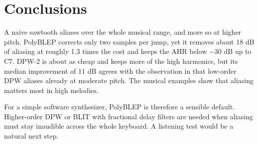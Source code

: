 \section{Conclusions}\label{sec:conclusions}

A naive sawtooth aliases over the whole musical range, and more so at
higher pitch. PolyBLEP corrects only two samples per jump, yet it removes
about 18 dB of aliasing at roughly 1.3 times the cost and keeps the AHR
below $-30$ dB up to C7. DPW-2 is about as cheap and keeps more of the
high harmonics, but its median improvement of 11 dB agrees with the
observation in \cite{nam2010efficient} that low-order DPW aliases already
at moderate pitch. The musical examples show that aliasing matters most
in high melodies.

For a simple software synthesizer, PolyBLEP is therefore a sensible
default. Higher-order DPW or BLIT with fractional delay filters
\cite{valimaki2010dpw,nam2010efficient} are needed when aliasing must stay
inaudible across the whole keyboard. A listening test would be a natural
next step.
